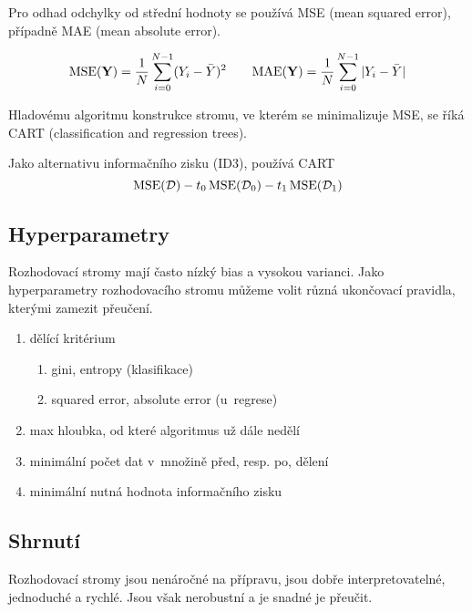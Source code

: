 Pro odhad odchylky od střední hodnoty se používá MSE (mean squared error), případně MAE (mean absolute error).

\begin{equation*}
    \begin{aligned}[t]
        \operatorname{MSE}(\mathbf{Y}) = \frac{1}{N} \sum_{i=0}^{N-1} (Y_i - \bar{Y})^2
    \end{aligned}
    \qquad
    \begin{aligned}[t]
        \operatorname{MAE}(\mathbf{Y}) = \frac{1}{N} \sum_{i=0}^{N-1} |Y_i - \bar{Y}|
    \end{aligned}
\end{equation*}

Hladovému algoritmu konstrukce stromu, ve kterém se minimalizuje MSE, se říká CART (classification and regression trees).

Jako alternativu informačního zisku (ID3), používá CART
\begin{equation*}
    \operatorname{MSE}(\mathcal{D}) - t_0 \operatorname{MSE}(\mathcal{D}_0) - t_1 \operatorname{MSE}(\mathcal{D}_1)
\end{equation*}

\subsection{Hyperparametry}

Rozhodovací stromy mají často nízký bias a vysokou varianci. Jako hyperparametry rozhodovacího stromu můžeme volit různá ukončovací pravidla, kterými zamezit přeučení.
\begin{enumerate}
    \item dělící kritérium
          \begin{enumerate}
              \item gini, entropy (klasifikace)
              \item squared error, absolute error (u~regrese)
          \end{enumerate}
    \item max hloubka, od které algoritmus už dále nedělí
    \item minimální počet dat v~množině před, resp. po, dělení
    \item minimální nutná hodnota informačního zisku
\end{enumerate}

\subsection{Shrnutí}

Rozhodovací stromy jsou nenáročné na přípravu, jsou dobře interpretovatelné, jednoduché a rychlé. Jsou však nerobustní a je snadné je přeučit.

